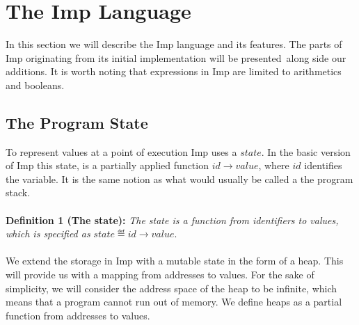 \section{The Imp Language}
\label{sec:background_imp}
In this section we will describe the Imp language and its features. The parts of Imp originating from its initial implementation will be presented\,\cite{Pierce:SF} along side our additions. It is worth noting that expressions in Imp are limited to arithmetics and booleans.

\subsection{The Program State}
To represent values at a point of execution Imp uses a $state$. In the basic version of Imp this state, is a partially applied function $id \to value$, where $id$ identifies the variable. It is the same notion as what would usually be called a the program stack.

\paragraph{}
\textbf{Definition 1 (The state):} \textit{The state is a function from identifiers to values, which is specified as }$state \eqdef id \to value.$

\paragraph{}
We extend the storage in Imp with a mutable state in the form of a heap. This will provide us with a mapping from addresses to values. For the sake of simplicity, we will consider the address space of the heap to be infinite, which means that a program cannot run out of memory. We define heaps as a partial function from addresses to values.

